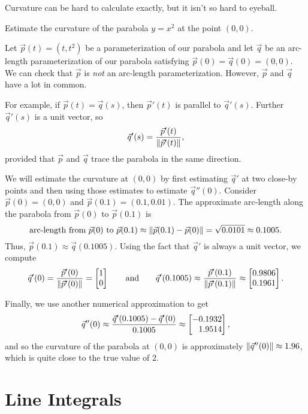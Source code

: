 Curvature can be hard to calculate exactly, but it isn't so hard to eyeball.

\begin{example}
	Estimate the curvature of the parabola $y=x^2$ at the point $(0,0)$.
	
	Let $\vec p(t)=(t,t^2)$ be a parameterization of our parabola
	and let $\vec q$ be an arc-length parameterization of our parabola
	satisfying $\vec p(0)=\vec q(0)=(0,0)$.
	We can check that $\vec p$ is \emph{not} an arc-length parameterization.  
	However, $\vec p$ and $\vec q$ have a lot in common.

	For example, if $\vec p(t)=\vec q(s)$,
	then $\vec p'(t)$ is parallel to $\vec q'(s)$.  Further $\vec q'(s)$ is a unit
	vector, so
	\[
		\vec q'(s) = \frac{\vec p'(t)}{\lVert\vec p'(t)\rVert},
	\]
	provided that $\vec p$ and $\vec q$ trace the parabola in the same direction.

	We will estimate the curvature at $(0,0)$
	by first estimating $\vec q'$ at two close-by points and then using
	those estimates to estimate $\vec q''(0)$.
	Consider $\vec p(0)=(0,0)$ and $\vec p(0.1) = (0.1, 0.01)$.  The approximate
	arc-length along the parabola from $\vec p(0)$ to $\vec p(0.1)$ is 
	\[
		\text{arc-length from }\vec p(0)\text{ to }\vec p(0.1)
		\approx \lVert\vec p(0.1) - \vec p(0)\rVert = \sqrt{0.0101}
		\approx 0.1005.
	\]
	Thus, $\vec p(0.1)\approx \vec q(0.1005)$.  Using the fact that
	$\vec q'$ is always a unit vector, we compute
	\[
		\vec q'(0) = \frac{\vec p'(0)}{\norm{\vec p'(0)}} = \mat{1\\0}
		\qquad\text{and}\qquad
		\vec q'(0.1005) \approx \frac{\vec p'(0.1)}{\norm{\vec p'(0.1)}}
		\approx\mat{0.9806\\0.1961}.
	\]

	Finally, we use another numerical approximation to get
	\[
		\vec q''(0) \approx \frac{\vec q'(0.1005)-\vec q'(0)}{0.1005}
		\approx \mat{-0.1932\\1.9514},
	\]
	and so the curvature of the parabola at $(0,0)$ is approximately
	$\lVert\vec q''(0)\rVert\approx 1.96$, which is quite close to the true value of $2$.
\end{example}

\begin{exercises}
\end{exercises}

\section{Line Integrals}


